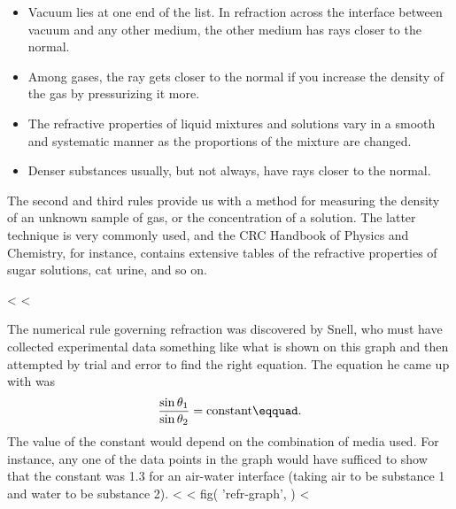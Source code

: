 \begin{itemize}

\item Vacuum lies at one end of the list. In refraction across
the interface between vacuum and any other medium, the other
medium has rays closer to the normal.

\item Among gases, the ray gets closer to the normal if you
increase the density of the gas by pressurizing it more.

\item The refractive properties of liquid mixtures and solutions
vary in a smooth and systematic manner as the proportions of
the mixture are changed.

\item Denser substances usually, but not always, have rays
closer to the normal.

\end{itemize}

The second and third rules provide us with a method for
measuring the density of an unknown sample of gas, or the
concentration of a solution. The latter technique is very
commonly used, and the CRC Handbook of Physics and
Chemistry, for instance, contains extensive tables of the
refractive properties of sugar solutions, cat urine, and so on.

<%
<%

The numerical rule governing refraction was discovered by
Snell, who must have collected experimental data something
like what is shown on this graph and then attempted by trial
and error to find the right equation. The equation he came up with was
\begin{equation*}
        \frac{\sin\theta_1}{\sin\theta_2}          =  \text{constant}\eqquad.
\end{equation*}
The value of the constant would depend on the combination of
media used. For instance, any one of the data points in the
graph would have sufficed to show that the constant was 1.3
for an air-water interface (taking air to be substance 1 and
water to be substance 2).
<%
<%
  fig(
    'refr-graph',
  )
<%

